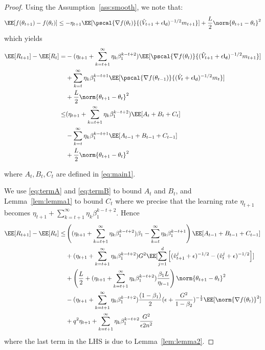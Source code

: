 \documentclass[11pt]{article}
\begin{document}
\begin{proof}
Using the Assumption~\ref{ass:smooth}, we note that:
\begin{equation}
\begin{split}
\EE[f(\theta_{t+1}) - f(\theta_{t}) ] \leq - \eta_{t+1} \EE[\pscal{\nabla f(\theta_{t})}{(\hat{V}_{t+1} + \epsilon \mathsf{I_d})^{-1/2} m_{t+1}}] +\frac{L}{2}  \norm{\theta_{t+1} - \theta_{t}}^2
\end{split}
\end{equation}
which yields
\begin{equation}
\begin{split}
\EE[R_{t+1}] - \EE[R_t] =& - (\eta_{t+1} + \sum_{k=t+1}^\infty \eta_{k} \beta_1^{k-t+2})\EE[\pscal{\nabla f(\theta_{t})}{(\hat{V}_{t+1} + \epsilon \mathsf{I_d})^{-1/2} m_{t+1}}] \\
& +  \sum_{k=t}^\infty \eta_{k} \beta_1^{k-t+1}\EE[\pscal{\nabla f(\theta_{t-1})}{(\hat{V}_{t} + \epsilon \mathsf{I_d})^{-1/2} m_{t}}]\\
& +\frac{L}{2}  \norm{\theta_{t+1} - \theta_{t}}^2\\
\leq&  (\eta_{t+1} + \sum_{k=t+1}^\infty \eta_{k} \beta_1^{k-t+2})\EE[A_t + B_t + C_t] \\
& -  \sum_{k=t}^\infty \eta_{k} \beta_1^{k-t+1}\EE[A_{t-1} + B_{t-1} + C_{t-1}]\\
& +\frac{L}{2}  \norm{\theta_{t+1} - \theta_{t}}^2
\end{split}
\end{equation}

where $A_t, B_t, C_t$ are defined in \eqref{eq:main1}.

We use \eqref{eq:termA} and \eqref{eq:termB} to bound $A_t$ and $B_t$, and Lemma~\ref{lem:lemma1} to bound $C_t$ where we precise that the learning rate $\eta_{t+1}$ becomes $ \eta_{t+1}+ \sum_{k=t+1}^\infty \eta_{k} \beta_1^{k-t+2}$.
Hence
\begin{equation}\label{eq:mainR}
\begin{split}
\EE[R_{t+1}] - \EE[R_t] \leq &
  \left( (\eta_{t+1} + \sum_{k=t+1}^\infty \eta_{k} \beta_1^{k-t+2}) \beta_1- \sum_{k=t}^\infty \eta_{k} \beta_1^{k-t+1}\right) \EE[A_{t-1} + B_{t-1} + C_{t-1}]\\
&  +  (\eta_{t+1}+ \sum_{k=t+1}^\infty \eta_{k} \beta_1^{k-t+2}) G^2 \EE[\sum_{j=1}^d \left[(\hat{v}^j_{t+1} + \epsilon )^{-1/2} - (\hat{v}^j_{t} + \epsilon )^{-1/2}  \right] ]\\
& + \left(\frac{L}{2} + (\eta_{t+1}+ \sum_{k=t+1}^\infty \eta_{k} \beta_1^{k-t+2})\frac{\beta_1 L}{\eta_{t-1}} \right)   \norm{\theta_{t+1} - \theta_{t}}^2\\
& - (\eta_{t+1}+ \sum_{k=t+1}^\infty \eta_{k} \beta_1^{k-t+2})\frac{(1-\beta_1)}{2}  (\epsilon + \frac{G^2}{1 - \beta_2})^{-\frac{1}{2}} \EE[\norm{\nabla f(\theta_t)}^2] \\
& +q^2 \eta_{t+1}+ \sum_{k=t+1}^\infty \eta_{k} \beta_1^{k-t+2}\frac{G^2 }{\epsilon 2n^2}
\end{split}
\end{equation}
where the last term in the LHS is due to Lemma~\ref{lem:lemma2}.


\end{proof}
\end{document}
